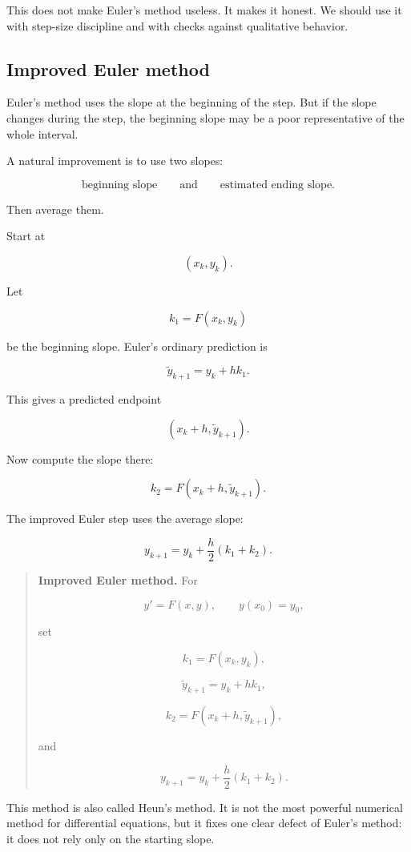 This does not make Euler's method useless.  It makes it honest.  We should use it with
step-size discipline and with checks against qualitative behavior.

\subsection{Improved Euler method}
\label{subsec:improved-euler-method}

Euler's method uses the slope at the beginning of the step.  But if the slope changes
during the step, the beginning slope may be a poor representative of the whole interval.

A natural improvement is to use two slopes:

\[
\text{beginning slope}
\qquad\text{and}\qquad
\text{estimated ending slope}.
\]

Then average them.

Start at

\[
(x_k,y_k).
\]

Let

\[
k_1=F(x_k,y_k)
\]

be the beginning slope.  Euler's ordinary prediction is

\[
\widetilde y_{k+1}=y_k+hk_1.
\]

This gives a predicted endpoint

\[
(x_k+h,\widetilde y_{k+1}).
\]

Now compute the slope there:

\[
k_2=F(x_k+h,\widetilde y_{k+1}).
\]

The improved Euler step uses the average slope:

\[
\boxed{
y_{k+1}
=
y_k+\frac{h}{2}(k_1+k_2).
}
\]

\begin{quote}
\textbf{Improved Euler method.}
For

\[
y'=F(x,y),
\qquad
y(x_0)=y_0,
\]

set

\[
k_1=F(x_k,y_k),
\]

\[
\widetilde y_{k+1}=y_k+hk_1,
\]

\[
k_2=F(x_k+h,\widetilde y_{k+1}),
\]

and

\[
\boxed{
y_{k+1}=y_k+\frac{h}{2}(k_1+k_2).
}
\]
\end{quote}

This method is also called Heun's method.  It is not the most powerful numerical method
for differential equations, but it fixes one clear defect of Euler's method: it does not rely
only on the starting slope.

